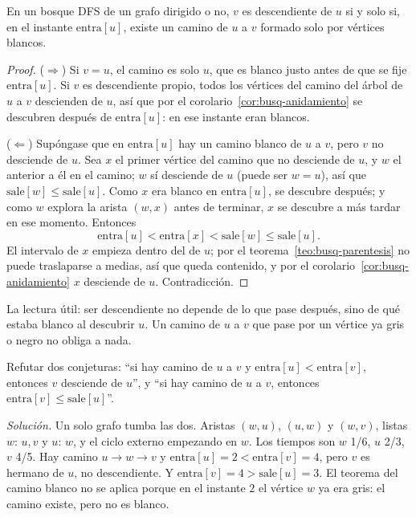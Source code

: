\documentclass[11pt,letterpaper]{article}
\begin{document}
\begin{teorema}
  \label{teo:busq-camino-blanco}
  En un bosque DFS de un grafo dirigido o no, $v$ es descendiente de
  $u$ si y solo si, en el instante $\text{entra}[u]$, existe un camino
  de $u$ a $v$ formado solo por vértices blancos.
\end{teorema}

\begin{proof}
  ($\Rightarrow$) Si $v = u$, el camino es solo $u$, que es blanco
  justo antes de que se fije $\text{entra}[u]$. Si $v$ es descendiente
  propio, todos los vértices del camino del árbol de $u$ a $v$
  descienden de $u$, así que por el
  corolario~\ref{cor:busq-anidamiento} se descubren después de
  $\text{entra}[u]$: en ese instante eran blancos.

  ($\Leftarrow$) Supóngase que en $\text{entra}[u]$ hay un camino
  blanco de $u$ a $v$, pero $v$ no desciende de $u$. Sea $x$ el primer
  vértice del camino que no desciende de $u$, y $w$ el anterior a él
  en el camino; $w$ sí desciende de $u$ (puede ser $w = u$), así que
  $\text{sale}[w] \leq \text{sale}[u]$. Como $x$ era blanco en
  $\text{entra}[u]$, se descubre después; y como $w$ explora la arista
  $(w, x)$ antes de terminar, $x$ se descubre a más tardar en ese
  momento. Entonces
  \[
    \text{entra}[u] < \text{entra}[x] < \text{sale}[w] \leq
    \text{sale}[u] .
  \]
  El intervalo de $x$ empieza dentro del de $u$; por el
  teorema~\ref{teo:busq-parentesis} no puede traslaparse a medias, así
  que queda contenido, y por el corolario~\ref{cor:busq-anidamiento}
  $x$ desciende de $u$. Contradicción.
\end{proof}

La lectura útil: ser descendiente no depende de lo que pase después,
sino de qué estaba blanco al descubrir $u$. Un camino de $u$ a $v$ que
pase por un vértice ya gris o negro no obliga a nada.

\begin{ejercicio}
  Refutar dos conjeturas: ``si hay camino de $u$ a $v$ y
  $\text{entra}[u] < \text{entra}[v]$, entonces $v$ desciende de
  $u$'', y ``si hay camino de $u$ a $v$, entonces
  $\text{entra}[v] \leq \text{sale}[u]$''.

  \textit{Solución.} Un solo grafo tumba las dos. Aristas
  $(w, u)$, $(u, w)$ y $(w, v)$, listas $w$: $u, v$ y $u$: $w$, y el
  ciclo externo empezando en $w$.
  Los tiempos son $w$ 1/6, $u$ 2/3, $v$ 4/5. Hay camino
  $u \to w \to v$ y $\text{entra}[u] = 2 < \text{entra}[v] = 4$, pero
  $v$ es hermano de $u$, no descendiente. Y
  $\text{entra}[v] = 4 > \text{sale}[u] = 3$. El teorema del camino
  blanco no se aplica porque en el instante $2$ el vértice $w$ ya era
  gris: el camino existe, pero no es blanco.
\end{ejercicio}
\end{document}

